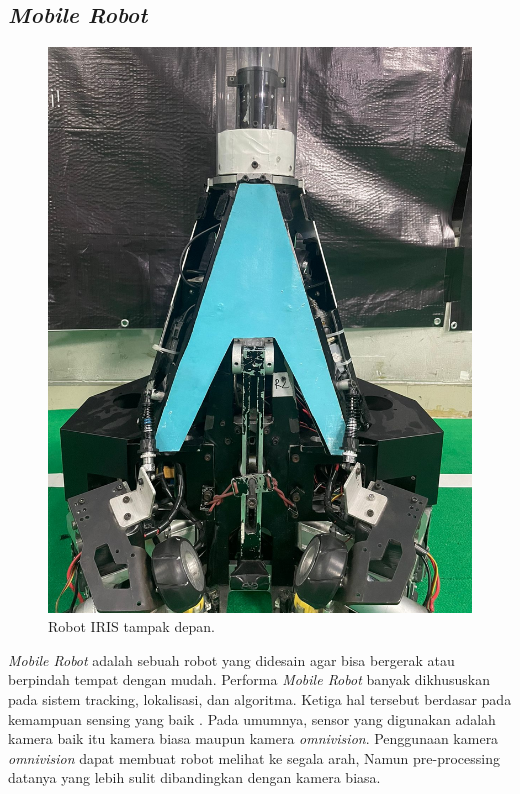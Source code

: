 \subsection{\emph{Mobile Robot}}
\label{sec:mobile_robot}
\begin{figure}[H]
    \centering
  
    \includegraphics[scale=0.10]{gambar/iris1.jpeg}
  
    \caption{Robot IRIS tampak depan.}
    \label{fig:mobile_robot}
\end{figure}
\emph{Mobile Robot} adalah sebuah robot yang didesain agar bisa bergerak 
atau berpindah tempat dengan mudah. Performa \emph{Mobile Robot} banyak 
dikhususkan pada sistem tracking, lokalisasi, dan algoritma. Ketiga 
hal tersebut berdasar pada kemampuan sensing yang baik \Parencite{ref_mobile_robot}. 
Pada umumnya, sensor yang digunakan adalah kamera baik itu kamera biasa 
maupun kamera \emph{omnivision}. Penggunaan kamera \emph{omnivision} dapat 
membuat robot melihat ke segala arah, Namun pre-processing datanya yang 
lebih sulit dibandingkan dengan kamera biasa.


